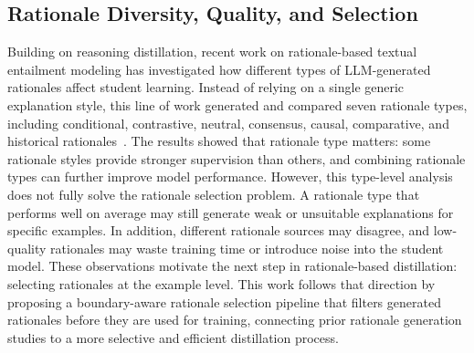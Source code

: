\subsection{Rationale Diversity, Quality, and Selection}

Building on reasoning distillation, recent work on rationale-based textual entailment modeling has investigated how different types of LLM-generated rationales affect student learning. Instead of relying on a single generic explanation style, this line of work generated and compared seven rationale types, including conditional, contrastive, neutral, consensus, causal, comparative, and historical rationales~\cite{our_rationale_te_paper}. The results showed that rationale type matters: some rationale styles provide stronger supervision than others, and combining rationale types can further improve model performance. However, this type-level analysis does not fully solve the rationale selection problem. A rationale type that performs well on average may still generate weak or unsuitable explanations for specific examples. In addition, different rationale sources may disagree, and low-quality rationales may waste training time or introduce noise into the student model. These observations motivate the next step in rationale-based distillation: selecting rationales at the example level. This work follows that direction by proposing a boundary-aware rationale selection pipeline that filters generated rationales before they are used for training, connecting prior rationale generation studies to a more selective and efficient distillation process.

